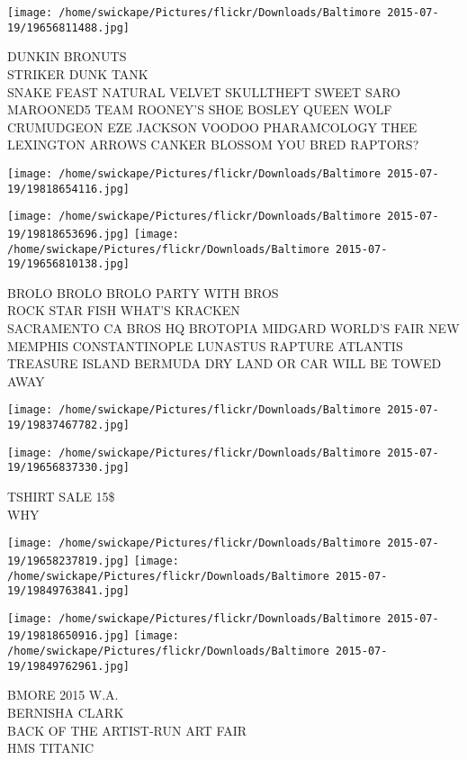 \documentclass[10pt,letterpaper]{article}
\begin{document}
\texttt{[image: /home/swickape/Pictures/flickr/Downloads/Baltimore 2015-07-19/19656811488.jpg]}

DUNKIN BRONUTS\\
STRIKER DUNK TANK\\
SNAKE FEAST NATURAL VELVET SKULLTHEFT SWEET SARO MAROONED5 TEAM ROONEY'S SHOE BOSLEY QUEEN WOLF CRUMUDGEON EZE JACKSON VOODOO PHARAMCOLOGY THEE LEXINGTON ARROWS CANKER BLOSSOM YOU BRED RAPTORS?
\pagebreak

\texttt{[image: /home/swickape/Pictures/flickr/Downloads/Baltimore 2015-07-19/19818654116.jpg]}

\vspace{0.25in}
\texttt{[image: /home/swickape/Pictures/flickr/Downloads/Baltimore 2015-07-19/19818653696.jpg]}
\texttt{[image: /home/swickape/Pictures/flickr/Downloads/Baltimore 2015-07-19/19656810138.jpg]}

BROLO BROLO BROLO PARTY WITH BROS\\
ROCK STAR FISH WHAT'S KRACKEN\\
SACRAMENTO CA BROS HQ BROTOPIA MIDGARD WORLD'S FAIR NEW MEMPHIS CONSTANTINOPLE LUNASTUS RAPTURE ATLANTIS TREASURE ISLAND BERMUDA DRY LAND OR CAR WILL BE TOWED AWAY
\pagebreak

\texttt{[image: /home/swickape/Pictures/flickr/Downloads/Baltimore 2015-07-19/19837467782.jpg]}

\vspace{0.25in}
\texttt{[image: /home/swickape/Pictures/flickr/Downloads/Baltimore 2015-07-19/19656837330.jpg]}

TSHIRT SALE 15\$\\
WHY
\pagebreak

\texttt{[image: /home/swickape/Pictures/flickr/Downloads/Baltimore 2015-07-19/19658237819.jpg]}
\texttt{[image: /home/swickape/Pictures/flickr/Downloads/Baltimore 2015-07-19/19849763841.jpg]}

\texttt{[image: /home/swickape/Pictures/flickr/Downloads/Baltimore 2015-07-19/19818650916.jpg]}
\texttt{[image: /home/swickape/Pictures/flickr/Downloads/Baltimore 2015-07-19/19849762961.jpg]}

BMORE 2015 W.A.\\
BERNISHA CLARK\\
BACK OF THE ARTIST{-}RUN ART FAIR\\
HMS TITANIC
\pagebreak
\end{document}
